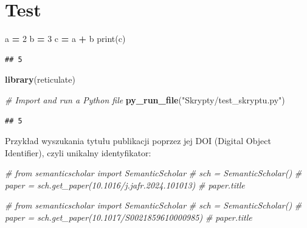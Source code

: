 \documentclass[
]{article}
\author{}
\date{\vspace{-2.5em}}
\newenvironment{Shaded}{\begin{snugshade}}{\end{snugshade}}
\newcommand{\BuiltInTok}[1]{#1}
\newcommand{\CommentTok}[1]{\textcolor[rgb]{0.56,0.35,0.01}{\textit{#1}}}
\newcommand{\DecValTok}[1]{\textcolor[rgb]{0.00,0.00,0.81}{#1}}
\newcommand{\FunctionTok}[1]{\textcolor[rgb]{0.13,0.29,0.53}{\textbf{#1}}}
\newcommand{\NormalTok}[1]{#1}
\newcommand{\OperatorTok}[1]{\textcolor[rgb]{0.81,0.36,0.00}{\textbf{#1}}}
\newcommand{\StringTok}[1]{\textcolor[rgb]{0.31,0.60,0.02}{#1}}
\begin{document}
\hypertarget{test}{%
\section{\texorpdfstring{Test\label{label1}}{Test}}\label{test}}

\begin{Shaded}
\begin{Highlighting}[]
\NormalTok{a }\OperatorTok{=} \DecValTok{2}
\NormalTok{b }\OperatorTok{=} \DecValTok{3}
\NormalTok{c }\OperatorTok{=}\NormalTok{ a }\OperatorTok{+}\NormalTok{ b}
\BuiltInTok{print}\NormalTok{(c)}
\end{Highlighting}
\end{Shaded}

\begin{verbatim}
## 5
\end{verbatim}

\begin{Shaded}
\begin{Highlighting}[]
\FunctionTok{library}\NormalTok{(reticulate)}

\CommentTok{\# Import and run a Python file}
\FunctionTok{py\_run\_file}\NormalTok{(}\StringTok{"Skrypty/test\_skryptu.py"}\NormalTok{)}
\end{Highlighting}
\end{Shaded}

\begin{verbatim}
## 5
\end{verbatim}

Przykład wyszukania tytułu publikacji poprzez jej DOI (Digital Object
Identifier), czyli unikalny identyfikator:

\begin{Shaded}
\begin{Highlighting}[]

\CommentTok{\# from semanticscholar import SemanticScholar}
\CommentTok{\# sch = SemanticScholar()}
\CommentTok{\# paper = sch.get\_paper(\textquotesingle{}10.1016/j.jafr.2024.101013\textquotesingle{})}
\CommentTok{\# paper.title}
\end{Highlighting}
\end{Shaded}

\begin{Shaded}
\begin{Highlighting}[]

\CommentTok{\# from semanticscholar import SemanticScholar}
\CommentTok{\# sch = SemanticScholar()}
\CommentTok{\# paper = sch.get\_paper(\textquotesingle{}10.1017/S0021859610000985\textquotesingle{})}
\CommentTok{\# paper.title}
\end{Highlighting}
\end{Shaded}
\end{document}
